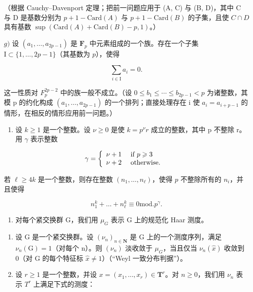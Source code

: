 （根据 Cauchy–Davenport 定理；把前一问题应用于 (A, C) 与 (B, D)，其中 C 与 D 是基数分别为 \(p + 1 - \text{Card}(A)\) 与 \(p + 1 - \text{Card}(B)\) 的子集，且使 \(C \cap D\) 具有基数 \(\sup(\text{Card}(A) + \text{Card}(B) - p, 1)\)。）

\(g)\) 设 \((a_{1},\ldots ,a_{2p - 1})\) 是 \(\mathbf{F}_p\) 中元素组成的一个族。存在一个子集 \(\mathrm{I}\subset \{1,\dots ,2p - 1\}\)（其基数为 \(p\)），使得

\[
\sum_ {i \in \mathrm{I}} a _ {i} = 0.
\]

这一性质对 \(F_{p}^{2p-2}\) 中的族一般不成立。（设 \(0 \leqslant b_{1} \leqslant \cdots \leqslant b_{2p-1} < p\) 为诸整数，其模 p 的约化构成 \((a_{1}, \ldots, a_{2p-1})\) 的一个排列；直接处理存在 i 使 \(a_{i} = a_{i+p-1}\) 的情形，在相反的情形应用前一问题。）

\begin{enumerate}
\def\labelenumi{\alph{enumi})}
\setcounter{enumi}{7}
\tightlist
\item
  设 \(k \geqslant 1\) 是一个整数。设 \(\nu \geqslant 0\) 是使 \(k = p^{\nu}r\) 成立的整数，其中 p 不整除 r。用 \(\gamma\) 表示整数
\end{enumerate}

\[
\gamma = \left\{ \begin{array}{l l} \nu + 1 & \text { if } p \geqslant 3 \\ \nu + 2 & \text { otherwise. } \end{array} \right.
\]

若 \(\ell \geqslant 4k\) 是一个整数，则存在整数 \((n_1, \ldots, n_\ell)\)，使得 \(p\) 不整除所有的 \(n_i\)，并且使得

\[
n _ {1} ^ {k} + \dots + n _ {\ell} ^ {k} \equiv 0 \mathrm{mod.} p ^ {\gamma}.
\]

\begin{enumerate}
\def\labelenumi{\arabic{enumi})}
\setcounter{enumi}{33}
\tightlist
\item
  对每个紧交换群 G，我们用 \(\mu_{G}\) 表示 G 上的规范化 Haar 测度。
\end{enumerate}

\begin{enumerate}
\def\labelenumi{\alph{enumi})}
\item
  设 G 是一个紧交换群。设 \((\nu_{n})_{n\in\mathbf{N}}\) 是 G 上的一个测度序列，满足 \(\nu_{n}(\mathrm{G})=1\)（对每个 n）。则 \((\nu_{n})\) 淡收敛于 \(\mu_{G}\)，当且仅当 \(\nu_{n}(\widehat{x})\) 收敛到 0（对 G 的每个特征标 \(\widehat{x}\neq1\)）（“Weyl 一致分布判据”）。
\item
  设 \(r \geqslant 1\) 是一个整数，并设 \(x = (x_{1}, \ldots, x_{r}) \in \mathbf{T}^{r}\)。对 \(n \geqslant 0\)，我们用 \(\nu_{n}\) 表示 \(T^{r}\) 上满足下式的测度：
\end{enumerate}


